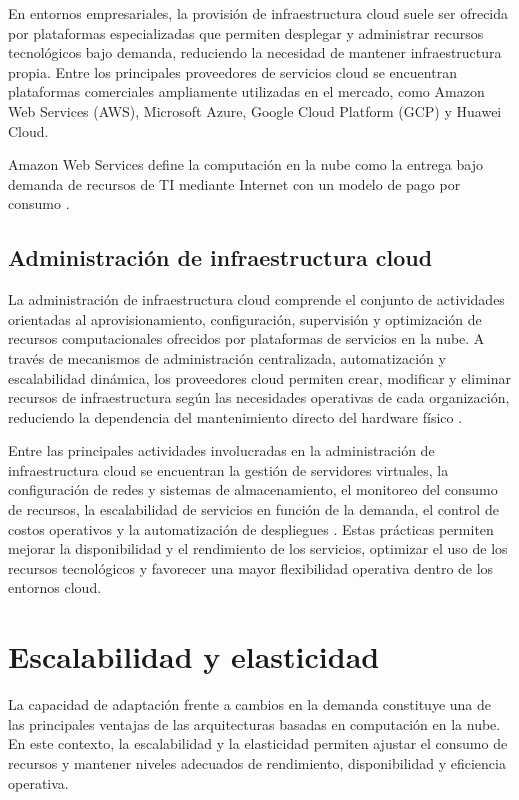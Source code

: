 En entornos empresariales, la provisión de infraestructura cloud suele ser ofrecida por plataformas especializadas que permiten desplegar y administrar recursos tecnológicos bajo demanda, reduciendo la necesidad de mantener infraestructura propia. Entre los principales proveedores de servicios cloud se encuentran plataformas comerciales ampliamente utilizadas en el mercado, como Amazon Web Services (AWS), Microsoft Azure, Google Cloud Platform (GCP) y Huawei Cloud.

Amazon Web Services define la computación en la nube como la entrega bajo demanda de recursos de TI mediante Internet con un modelo de pago por consumo \parencite{AWS2024}.

\subsection{Administración de infraestructura cloud}

La administración de infraestructura cloud comprende el conjunto de actividades orientadas al aprovisionamiento, configuración, supervisión y optimización de recursos computacionales ofrecidos por plataformas de servicios en la nube. A través de mecanismos de administración centralizada, automatización y escalabilidad dinámica, los proveedores cloud permiten crear, modificar y eliminar recursos de infraestructura según las necesidades operativas de cada organización, reduciendo la dependencia del mantenimiento directo del hardware físico \parencite{Mell2011, AWS2023}.

Entre las principales actividades involucradas en la administración de infraestructura cloud se encuentran la gestión de servidores virtuales, la configuración de redes y sistemas de almacenamiento, el monitoreo del consumo de recursos, la escalabilidad de servicios en función de la demanda, el control de costos operativos y la automatización de despliegues \parencite{AWS2026}. Estas prácticas permiten mejorar la disponibilidad y el rendimiento de los servicios, optimizar el uso de los recursos tecnológicos y favorecer una mayor flexibilidad operativa dentro de los entornos cloud.

\section{Escalabilidad y elasticidad}

La capacidad de adaptación frente a cambios en la demanda constituye una de las principales ventajas de las arquitecturas basadas en computación en la nube. En este contexto, la escalabilidad y la elasticidad permiten ajustar el consumo de recursos y mantener niveles adecuados de rendimiento, disponibilidad y eficiencia operativa.

